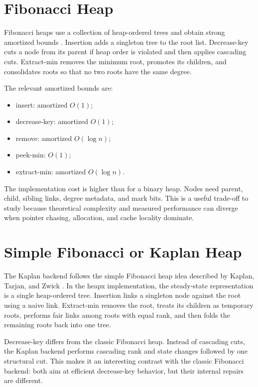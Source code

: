 \section{Fibonacci Heap}

Fibonacci heaps use a collection of heap-ordered trees and obtain strong amortized bounds \cite{fredman1987fibonacci}.
Insertion adds a singleton tree to the root list.
Decrease-key cuts a node from its parent if heap order is violated and then applies cascading cuts.
Extract-min removes the minimum root, promotes its children, and consolidates roots so that no two roots have the same degree.

The relevant amortized bounds are:

\begin{itemize}
    \item insert: amortized $O(1)$;
    \item decrease-key: amortized $O(1)$;
    \item remove: amortized $O(\log n)$;
    \item peek-min: $O(1)$;
    \item extract-min: amortized $O(\log n)$.
\end{itemize}

The implementation cost is higher than for a binary heap.
Nodes need parent, child, sibling links, degree metadata, and mark bits.
This is a useful trade-off to study because theoretical complexity and measured performance can diverge when pointer chasing, allocation, and cache locality dominate.

\section{Simple Fibonacci or Kaplan Heap}

The Kaplan backend follows the simple Fibonacci heap idea described by Kaplan, Tarjan, and Zwick \cite{kaplan2014fibonacci}.
In the heapx implementation, the steady-state representation is a single heap-ordered tree.
Insertion links a singleton node against the root using a naive link.
Extract-min removes the root, treats its children as temporary roots, performs fair links among roots with equal rank, and then folds the remaining roots back into one tree.

Decrease-key differs from the classic Fibonacci heap.
Instead of cascading cuts, the Kaplan backend performs cascading rank and state changes followed by one structural cut.
This makes it an interesting contrast with the classic Fibonacci backend: both aim at efficient decrease-key behavior, but their internal repairs are different.

